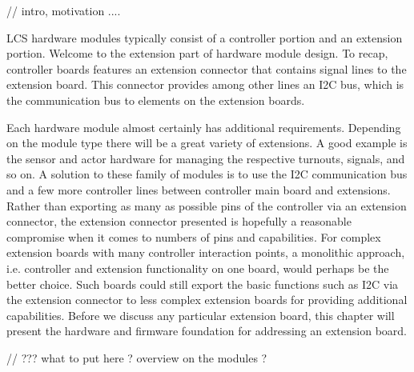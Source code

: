 
// intro, motivation ....



LCS hardware modules typically consist of a controller portion and an extension portion. Welcome to the extension part of hardware module design. To recap, controller boards features an extension connector that contains signal lines to the extension board. This connector provides among other lines an I2C bus, which is the communication bus to elements on the extension boards.

Each hardware module almost certainly has additional requirements. Depending on the module type there will be a great variety of extensions. A good example is the sensor and actor hardware for managing the respective turnouts, signals, and so on. A solution to these family of modules is to use the I2C communication bus and a few more controller lines between controller main board and extensions. Rather than exporting as many as possible pins of the controller via an extension connector, the extension connector presented is hopefully a reasonable compromise when it comes to numbers of pins and capabilities. For complex extension boards with many controller interaction points, a monolithic approach, i.e. controller and extension functionality on one board, would perhaps be the better choice. Such boards could still export the basic functions such as I2C via the extension connector to less complex extension boards for providing additional capabilities. Before we discuss any particular extension board, this chapter will present the hardware and firmware foundation for addressing an extension board.



// ??? what to put here ? overview on the modules ? 


